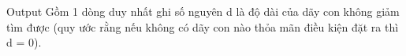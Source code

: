 Output
Gồm 1 dòng duy nhất ghi số nguyên d là độ dài của dãy con không giảm tìm được (quy ước rằng nếu không có dãy con nào thỏa mãn điều kiện đặt ra thì d = 0).